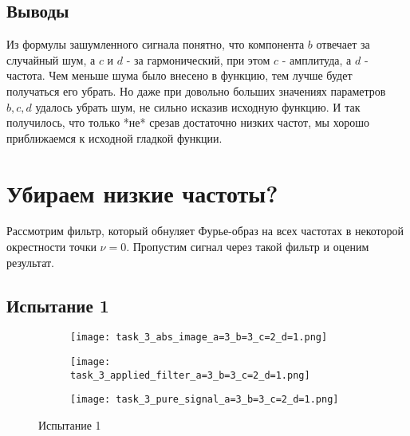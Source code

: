 \newpage
\subsection{Выводы}

Из формулы зашумленного сигнала понятно, что компонента $b$ отвечает за случайный шум, а $c$ и $d$ - за
гармонический, при этом $c$ - амплитуда, а $d$ - частота. Чем меньше шума было внесено в функцию, тем лучше будет получаться
его убрать. Но даже при довольно больших значениях параметров $b, c, d$ удалось убрать шум,
не сильно исказив исходную функцию. И так получилось, что только *не* срезав достаточно низких частот, мы хорошо приближаемся к исходной гладкой функции.

\newpage
\section{Убираем низкие частоты?}

Рассмотрим фильтр, который обнуляет Фурье-образ на всех частотах в некоторой окрестности точки $\nu = 0$. 
Пропустим сигнал через такой фильтр и оценим результат.

\subsection{Испытание 1}

\begin{figure}[!ht]
	\centering
\hspace*{\fill}%
	\begin{subfigure}[b]{0.30\textwidth}
        \centering
		\texttt{[image: task\_3\_abs\_image\_a=3\_b=3\_c=2\_d=1.png]}
		\caption{}
	
	\end{subfigure}
\hfill
	\begin{subfigure}[b]{0.30\textwidth}
        \centering
		\texttt{[image: task\_3\_applied\_filter\_a=3\_b=3\_c=2\_d=1.png]}
        \caption{}
		
	\end{subfigure}
\hspace*{\fill}%
\par\vspace{\abovecaptionskip}
        \begin{subfigure}[b]{0.30\textwidth}
        \centering
		\texttt{[image: task\_3\_pure\_signal\_a=3\_b=3\_c=2\_d=1.png]}
		\caption{}
	
	\end{subfigure}
	\caption{Испытание 1}
\end{figure}

